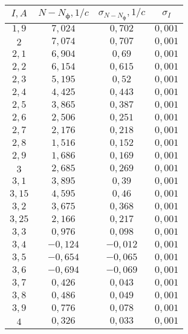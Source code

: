 \begin{tabular}{| c | c | c | c |}
    \hline
    $I, A$ & $N - N_ф, 1/c$ & $\sigma_{N - N_ф}, 1/c$ & $\sigma_{I}$\\
    \hline
    $1,9$ & $7,024$ & $0,702$ & $0,001$\\
    \hline
    $2$ & $7,074$ & $0,707$ & $0,001$\\
    \hline
    $2,1$ & $6,904$ & $0,69$ & $0,001$\\
    \hline
    $2,2$ & $6,154$ & $0,615$ & $0,001$\\
    \hline
    $2,3$ & $5,195$ & $0,52$ & $0,001$\\
    \hline
    $2,4$ & $4,425$ & $0,443$ & $0,001$\\
    \hline
    $2,5$ & $3,865$ & $0,387$ & $0,001$\\
    \hline
    $2,6$ & $2,506$ & $0,251$ & $0,001$\\
    \hline
    $2,7$ & $2,176$ & $0,218$ & $0,001$\\
    \hline
    $2,8$ & $1,516$ & $0,152$ & $0,001$\\
    \hline
    $2,9$ & $1,686$ & $0,169$ & $0,001$\\
    \hline
    $3$ & $2,685$ & $0,269$ & $0,001$\\
    \hline
    $3,1$ & $3,895$ & $0,39$ & $0,001$\\
    \hline
    $3,15$ & $4,595$ & $0,46$ & $0,001$\\
    \hline
    $3,2$ & $3,675$ & $0,368$ & $0,001$\\
    \hline
    $3,25$ & $2,166$ & $0,217$ & $0,001$\\
    \hline
    $3,3$ & $0,976$ & $0,098$ & $0,001$\\
    \hline
    $3,4$ & $-0,124$ & $-0,012$ & $0,001$\\
    \hline
    $3,5$ & $-0,654$ & $-0,065$ & $0,001$\\
    \hline
    $3,6$ & $-0,694$ & $-0,069$ & $0,001$\\
    \hline
    $3,7$ & $0,426$ & $0,043$ & $0,001$\\
    \hline
    $3,8$ & $0,486$ & $0,049$ & $0,001$\\
    \hline
    $3,9$ & $0,776$ & $0,078$ & $0,001$\\
    \hline
    $4$ & $0,326$ & $0,033$ & $0,001$\\
    \hline
    \end{tabular}